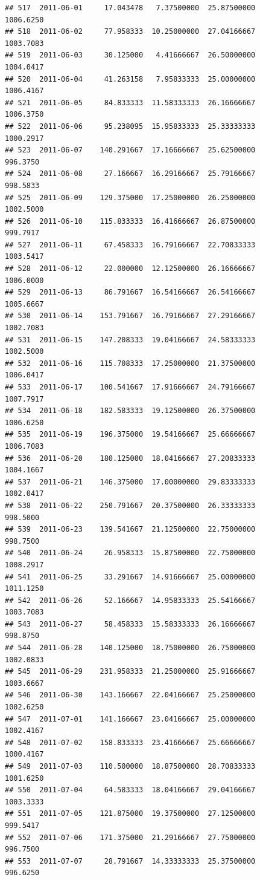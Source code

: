 \documentclass[
]{article}
\begin{document}
\begin{verbatim}
## 517  2011-06-01     17.043478   7.37500000  25.87500000    1006.6250
## 518  2011-06-02     77.958333  10.25000000  27.04166667    1003.7083
## 519  2011-06-03     30.125000   4.41666667  26.50000000    1004.0417
## 520  2011-06-04     41.263158   7.95833333  25.00000000    1006.4167
## 521  2011-06-05     84.833333  11.58333333  26.16666667    1006.3750
## 522  2011-06-06     95.238095  15.95833333  25.33333333    1000.2917
## 523  2011-06-07    140.291667  17.16666667  25.62500000     996.3750
## 524  2011-06-08     27.166667  16.29166667  25.79166667     998.5833
## 525  2011-06-09    129.375000  17.25000000  26.25000000    1002.5000
## 526  2011-06-10    115.833333  16.41666667  26.87500000     999.7917
## 527  2011-06-11     67.458333  16.79166667  22.70833333    1003.5417
## 528  2011-06-12     22.000000  12.12500000  26.16666667    1006.0000
## 529  2011-06-13     86.791667  16.54166667  26.54166667    1005.6667
## 530  2011-06-14    153.791667  16.79166667  27.29166667    1002.7083
## 531  2011-06-15    147.208333  19.04166667  24.58333333    1002.5000
## 532  2011-06-16    115.708333  17.25000000  21.37500000    1006.0417
## 533  2011-06-17    100.541667  17.91666667  24.79166667    1007.7917
## 534  2011-06-18    182.583333  19.12500000  26.37500000    1006.6250
## 535  2011-06-19    196.375000  19.54166667  25.66666667    1006.7083
## 536  2011-06-20    180.125000  18.04166667  27.20833333    1004.1667
## 537  2011-06-21    146.375000  17.00000000  29.83333333    1002.0417
## 538  2011-06-22    250.791667  20.37500000  26.33333333     998.5000
## 539  2011-06-23    139.541667  21.12500000  22.75000000     998.7500
## 540  2011-06-24     26.958333  15.87500000  22.75000000    1008.2917
## 541  2011-06-25     33.291667  14.91666667  25.00000000    1011.1250
## 542  2011-06-26     52.166667  14.95833333  25.54166667    1003.7083
## 543  2011-06-27     58.458333  15.58333333  26.16666667     998.8750
## 544  2011-06-28    140.125000  18.75000000  26.75000000    1002.0833
## 545  2011-06-29    231.958333  21.25000000  25.91666667    1003.6667
## 546  2011-06-30    143.166667  22.04166667  25.25000000    1002.6250
## 547  2011-07-01    141.166667  23.04166667  25.00000000    1002.4167
## 548  2011-07-02    158.833333  23.41666667  25.66666667    1000.4167
## 549  2011-07-03    110.500000  18.87500000  28.70833333    1001.6250
## 550  2011-07-04     64.583333  18.04166667  29.04166667    1003.3333
## 551  2011-07-05    121.875000  19.37500000  27.12500000     999.5417
## 552  2011-07-06    171.375000  21.29166667  27.75000000     996.7500
## 553  2011-07-07     28.791667  14.33333333  25.37500000     996.6250

\end{verbatim}
\end{document}
